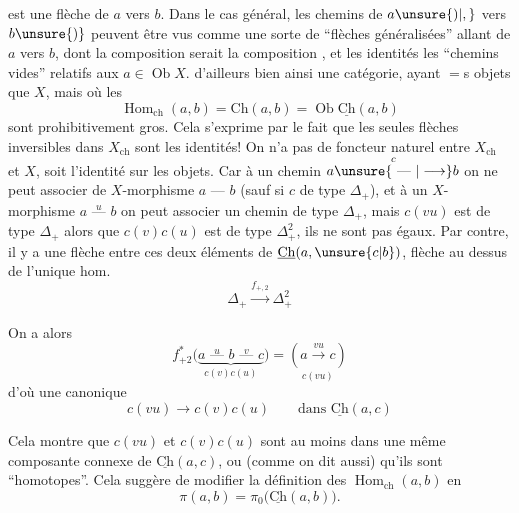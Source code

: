 
est une flèche de $a$ vers $b$. Dans le cas général, les chemins de $a\unsure{)|,}$ vers $b\unsure{)}$ peuvent être vus comme une sorte de ``flèches généralisées'' allant de $a$ vers $b$, dont la composition  serait la composition , et les identités les ``chemins vides'' relatifs aux $a\in\operatorname{Ob}X$.  d'ailleurs bien ainsi une catégorie, ayant $=$s objets que $X$, mais où les
\[
\operatorname{Hom}_{\mathrm{ch}}(a,b)=\mathrm{Ch}(a,b)=\operatorname{Ob}\underline{\mathrm{Ch}}(a,b)
\]
sont prohibitivement gros.  Cela s'exprime  par le fait que les seules flèches inversibles dans $X_{\mathrm{ch}}$ sont les identités! On n'a pas de foncteur naturel entre $X_{\mathrm{ch}}$ et $X$,  soit l'identité sur les objets. Car à un chemin $a\overset{c}{\unsure{\text{ --- }|\longrightarrow}}b$ on ne peut associer de $X$-morphisme $a\text{ --- }b$ (sauf si $c$ de type $\Delta_+$), et à un $X$-morphisme $a\overset{u}{\text{ --- }}b$ on peut associer un chemin  de type $\Delta_+$, mais   $c(vu)$ est  de type $\Delta_+$ alors que $c(v)c(u)$ est de type $\Delta_+^2$, ils ne sont pas égaux. Par contre, il y a une flèche  entre ces deux  éléments de $\underline{\mathrm{Ch}}(a,\unsure{c|b})$, flèche au dessus de  l'unique hom.
\[
\Delta_+\xrightarrow{f_{+,2}}\Delta_+^2
\]


On a alors
\[
f_{+2}^{*}\bigl(\underbrace{a\overset{u}{\text{ --- }}b\overset{v}{\text{ --- }}c}_{c(v)c(u)}\bigr)
=\underset{c(vu)}{(a\xrightarrow{vu}c)}
\]
d'où une  canonique
\[
c(vu)\longrightarrow c(v)c(u)\qquad\text{dans }\underline{\mathrm{Ch}}(a,c)
\]

Cela montre que $c(vu)$ et $c(v)c(u)$ sont  au moins dans une même composante connexe de $\underline{\mathrm{Ch}}(a,c)$, ou  (comme on dit aussi) qu'ils sont ``homotopes''. Cela suggère  de  modifier la définition des $\operatorname{Hom}_{\mathrm{ch}}(a,b)$ en
\[
\pi(a,b)=\pi_0\bigl(\underline{\mathrm{Ch}}(a,b)\bigr).
\]

